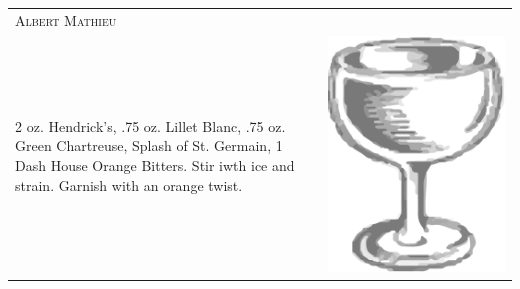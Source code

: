 \documentclass{article}
\begin{document}
\begin{multicols}{2}
\begin{tabular}{p{2in} p{0.5in}}
\multicolumn{2}{p{3in}}{\centering\Huge\textsc{Albert Mathieu}}\\ 
  \vspace{-0.1in} 2 oz. Hendrick's, .75 oz. Lillet Blanc, .75 oz. Green Chartreuse, Splash of St. Germain, 1 Dash House Orange Bitters. Stir iwth ice and strain. Garnish with an orange twist. &
  \vspace{-0.1in} \includegraphics{coupe.png}
\end{tabular}


\end{multicols}
\end{document}
